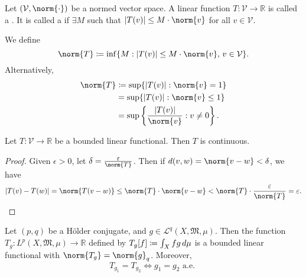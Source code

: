\documentclass[notoc,notitlepage]{tufte-book}
\begin{document}
\begin{defn}\label{defn:bounded_linear_functional}
  Let $(\mathcal{V}, \norm{\cdot})$ be a normed vector space.
  A linear function $T : \mathcal{V} \to \mathbb{R}$ is called
  a .
  It is called a 
  if $\exists M$ such that
  $\abs{T(v)} \leq M \cdot \norm{v}$ for all $v \in \mathcal{V}$.

  We define
  \begin{equation*}
    \norm{T} \coloneqq \inf \{ M
              : \abs{T(v)} \leq M \cdot \norm{v},\, v \in \mathcal{V} \}.
  \end{equation*}
  Alternatively,
  \begin{align*}
    \norm{T} &\coloneqq \sup \{ \abs{T(v)} : \norm{v} = 1 \} \\
             &= \sup \{ \abs{T(v)} : \norm{v} \leq 1 \} \\
             &= \sup \left\{ \frac{\abs{T(v)}}{\norm{v}} : v \neq 0 \right\}.
  \end{align*}
\end{defn}

\begin{propo}\label{propo:bounded_linear_functionals_are_continuous}
  Let $T : \mathcal{V} \to \mathbb{R}$ be a bounded linear functional. Then
  $T$ is continuous. 
\end{propo}

\begin{proof}
  Given $\epsilon > 0$, let $\delta = \frac{\epsilon}{\norm{T}}$.
  Then if $d(v, w) = \norm{v - w} < \delta$, we have
  \begin{align*}
    \abs{T(v) - T(w)} = \norm{T(v - w)} \leq \norm{T} \cdot \norm{v - w}
    < \norm{T} \cdot \frac{\epsilon}{\norm{T}} = \epsilon.
  \end{align*}
\end{proof}

\begin{propo}\label{propo:_p_norms_as_bounded_linear_functionals}
  Let $(p, q)$ be a Hölder conjugate,
  and $g \in \mathcal{L}^q(X, \mathfrak{M}, \mu)$.
  Then the function $T_g : L^p(X, \mathfrak{M}, \mu) \to \mathbb{R}$
  defined by $T_g[f] \coloneqq \int_{X} fg \mathop{}\!d{\mu}$ is a
  bounded linear functional with $\norm{T_g} = \norm{g}_q$.
  Moreover,
  \begin{equation*}
    T_{g_1} = T_{g_2} \iff g_1 = g_2 \text{ a.e. }
  \end{equation*}
\end{propo}
\end{document}
